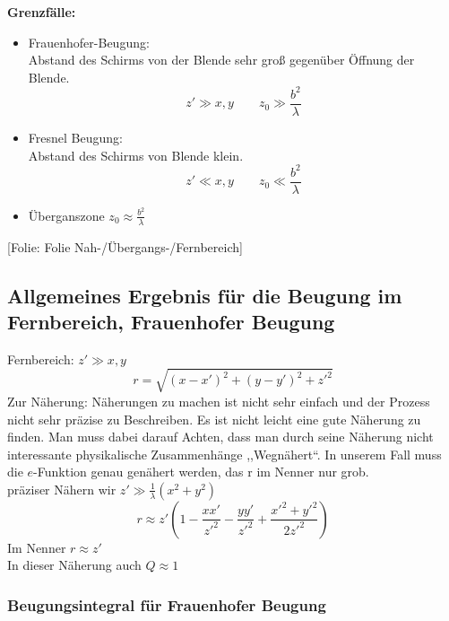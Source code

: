 \documentclass[titlepage,11pt,a4paper,ngerman]{report}
\newcommand{\folie}[1]{\color{gray}[Folie: #1]\color{black}}
\newcommand{\lcom}[1]{\color{MidnightBlue}#1\color{black}}
\begin{document}
\textbf{Grenzfälle:}\\
\begin{itemize}
	\item Frauenhofer-Beugung:\\
	Abstand des Schirms von der Blende sehr groß gegenüber Öffnung der Blende.
	\begin{equation*}
	z' \gg x,y \qquad z_0 \gg \frac{b^2}{\lambda}
	\end{equation*}
	\item Fresnel Beugung:\\
	Abstand des Schirms von Blende klein.
	\begin{equation*}
	z' \ll x,y \qquad z_0 \ll \frac{b^2}{\lambda}
	\end{equation*}
	\item Überganszone $ z_0 \approx \frac{b^2}{\lambda} $
\end{itemize}
\folie{Folie Nah-/Übergangs-/Fernbereich}

\subsection{Allgemeines Ergebnis für die Beugung im Fernbereich, Frauenhofer Beugung}

Fernbereich: $ z' \gg x,y $
\begin{equation*}
r = \sqrt{(x-x')^2 + (y-y')^2 + z'^2}
\end{equation*}
\lcom{Zur Näherung: Näherungen zu machen ist nicht sehr einfach und der Prozess nicht sehr präzise zu Beschreiben. Es ist nicht leicht eine gute Näherung zu finden. Man muss dabei darauf Achten, dass man durch seine Näherung nicht interessante physikalische Zusammenhänge ,,Wegnähert``. In unserem Fall muss die $ e $-Funktion genau genähert werden, das r im Nenner nur grob.}\\
präziser Nähern wir $ z' \gg \frac{1}{\lambda} (x^2 + y^2) $
\begin{equation*}
r \approx z' \left(1 - \frac{xx'}{z'^2} - \frac{yy'}{z'^2} + \frac{x'^2 + y'^2}{2 z'^2}\right)
\end{equation*}
Im Nenner $ r \approx z' $\\
In dieser Näherung auch $ Q \approx 1 $

\subsubsection{Beugungsintegral für Frauenhofer Beugung}
\end{document}
